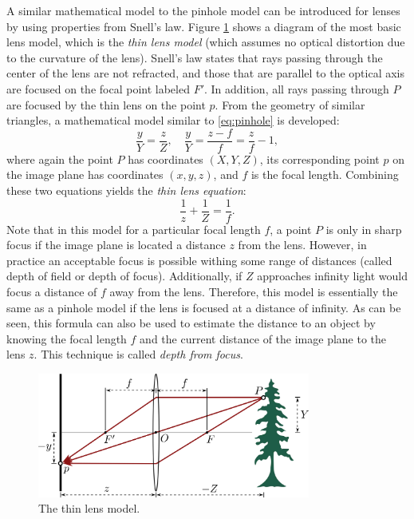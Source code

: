 A similar mathematical model to the pinhole model can be introduced for lenses by using properties from Snell's law. Figure \ref{fig:Lens} shows a diagram of the most basic lens model, which is the \textit{thin lens model} (which assumes no optical distortion due to the curvature of the lens). Snell's law states that rays passing through the center of the lens are not refracted, and those that are parallel to the optical axis are focused on the focal point labeled $F'$. In addition, all rays passing through $P$ are focused by the thin lens on the point $p$. From the geometry of similar triangles, a mathematical model similar to \eqref{eq:pinhole} is developed:
\begin{equation}
    \frac{y}{Y}=\frac{z}{Z}, \quad \frac{y}{Y}=\frac{z-f}{f}  = \frac{z}{f} -1,
\end{equation}
where again the point $P$ has coordinates $(X,Y,Z)$, its corresponding point $p$ on the image plane has coordinates $(x,y,z)$, and $f$ is the focal length.
Combining these two equations yields the \textit{thin lens equation}:
\begin{equation} \label{eq:thinlens}
    \frac{1}{z}+\frac{1}{Z}=\frac{1}{f}.
\end{equation}
Note that in this model for a particular focal length $f$, a point $P$ is only in sharp focus if the image plane is located a distance $z$ from the lens. However, in practice an acceptable focus is possible withing some range of distances (called depth of field or depth of focus). Additionally, if $Z$ approaches infinity light would focus a distance of $f$ away from the lens. Therefore, this model is essentially the same as a pinhole model if the lens is focused at a distance of infinity.
As can be seen, this formula can also be used to estimate the distance to an object by knowing the focal length $f$ and the current distance of the image plane to the lens $z$. This technique is called \textit{depth from focus}. 

\begin{figure}[ht]
\centering
\includegraphics[width=0.8\textwidth]{tex/figs/ch08_figs/thinlens.png}
\caption{The thin lens model.}
\label{fig:Lens}
\end{figure}
